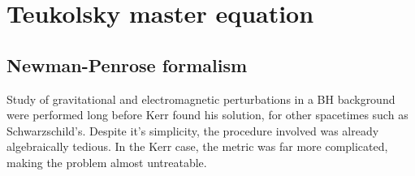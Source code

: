 
\chapter{Teukolsky master equation} %
\label{Chapter3}

\section{Newman-Penrose formalism}

Study of gravitational and electromagnetic perturbations in a BH background were performed long before Kerr found his solution, for other spacetimes such as Schwarzschild's. Despite it's simplicity, the procedure involved was already algebraically tedious. In the Kerr case, the metric was far more complicated, making the problem almost untreatable.

